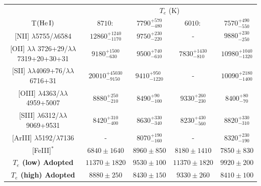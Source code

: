 \documentclass[fleqn,usenatbib]{mnras}
\begin{document}
\begin{table}
\begin{tabular}{ccccc}
 & \multicolumn{4}{c}{$T_e$ (K)}\\

T$\left(\mbox{He}\thinspace \mbox{I} \right)$ & $8710:$&$7790 ^{+570} _{-480}$ & $6010:$&$7570 ^{+490} _{-550}$\\

[N\thinspace II] $\lambda$5755/$\lambda$6584  & $12860^{+1240} _{-1170}$& $9750^{+230} _{-220}$&- &$9880^{+230} _{-250}$\\

[O\thinspace II] $\lambda \lambda$ 3726+29/$\lambda \lambda$7319+20+30+31 & $9180^{+1500} _{-630}$& $9500^{+740} _{-610}$& $7830^{+1430} _{-810}$&$10980^{+1040} _{-1320}$\\

[S\thinspace II] $\lambda \lambda$4069+76/$\lambda \lambda$ 6716+31& $20010^{+45030} _{-9150}$& $9410^{+950} _{-1220}$&-&$10090^{+2180} _{-1400}$\\

[O\thinspace III] $\lambda$4363/$\lambda \lambda$4959+5007& $8880^{+250} _{-210}$& $8490^{+90} _{-100}$ & $9330^{+260} _{-230}$& $8400^{+80} _{-70}$\\

[S\thinspace III] $\lambda$6312/$\lambda \lambda$9069+9531 & $8420^{+310} _{-400}$& $8630^{+330} _{-340}$& $8230^{+430} _{-560}$ & $8820^{+330} _{-310}$\\

[Ar\thinspace III]  $\lambda$5192/$\lambda$7136  & - & $8070^{+190} _{-160}$&-&$8320^{+230} _{-190}$\\

[Fe\thinspace III]$^{*}$ & $6840 \pm 1640$ & $8960 \pm 850$ & $8180 \pm 1410$& $7850 \pm 830$\\

\textbf{\boldmath${T_e}$ (low) Adopted} & \boldmath${11370 \pm 1820}$ & \boldmath${9530 \pm 100}$& \boldmath${11370 \pm 1820}$ & \boldmath${9920 \pm 200}$\\


\textbf{\boldmath${T_e}$ (high) Adopted} & \boldmath${8880 \pm 250}$ & \boldmath${8430 \pm 150}$ & \boldmath${9330 \pm 260}$ & \boldmath${8410 \pm 100}$\\

\hline
\end{tabular}
\end{table}

\end{document}
